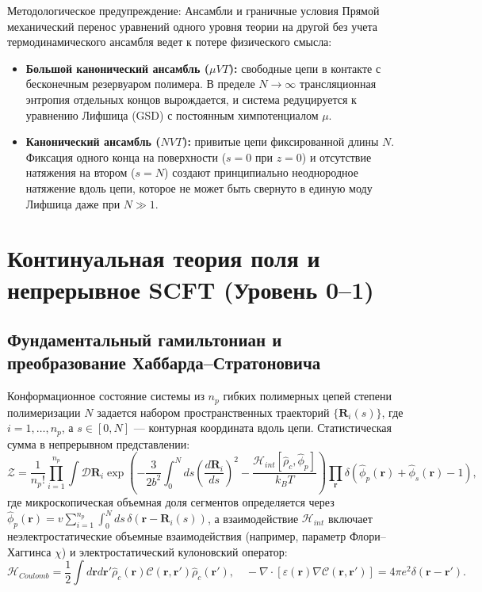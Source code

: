\documentclass[12pt,a4paper]{article}
\begin{document}
\begin{warningbox}{Методологическое предупреждение: Ансамбли и граничные условия}
Прямой механический перенос уравнений одного уровня теории на другой без учета термодинамического ансамбля ведет к потере физического смысла:
\begin{itemize}
    \item \textbf{Большой канонический ансамбль ($\mu VT$):} свободные цепи в контакте с бесконечным резервуаром полимера. В пределе $N \to \infty$ трансляционная энтропия отдельных концов вырождается, и система редуцируется к уравнению Лифшица (GSD) с постоянным химпотенциалом $\mu$.
    \item \textbf{Канонический ансамбль ($NVT$):} привитые цепи фиксированной длины $N$. Фиксация одного конца на поверхности ($s=0$ при $z=0$) и отсутствие натяжения на втором ($s=N$) создают принципиально неоднородное натяжение вдоль цепи, которое не может быть свернуто в единую моду Лифшица даже при $N \gg 1$.
\end{itemize}
\end{warningbox}

\section{Континуальная теория поля и непрерывное SCFT (Уровень 0--1)}

\subsection{Фундаментальный гамильтониан и преобразование Хаббарда--Стратоновича}
Конформационное состояние системы из $n_p$ гибких полимерных цепей степени полимеризации $N$ задается набором пространственных траекторий $\{\mathbf{R}_i(s)\}$, где $i = 1, \dots, n_p$, а $s \in [0, N]$ --- контурная координата вдоль цепи. Статистическая сумма в непрерывном представлении:
\begin{equation}
\mathcal{Z} = \frac{1}{n_p!} \prod_{i=1}^{n_p} \int \mathcal{D}\mathbf{R}_i \exp\left( -\frac{3}{2b^2}\int_0^N ds \left(\frac{d\mathbf{R}_i}{ds}\right)^2 - \frac{\mathcal{H}_{int}[\hat{\rho}_c, \hat{\phi}_p]}{k_B T} \right) \prod_{\mathbf{r}} \delta\left(\hat{\phi}_p(\mathbf{r}) + \hat{\phi}_s(\mathbf{r}) - 1\right),
\end{equation}
где микроскопическая объемная доля сегментов определяется через $\hat{\phi}_p(\mathbf{r}) = v \sum_{i=1}^{n_p} \int_0^N ds \, \delta(\mathbf{r} - \mathbf{R}_i(s))$, а взаимодействие $\mathcal{H}_{int}$ включает неэлектростатические объемные взаимодействия (например, параметр Флори--Хаггинса $\chi$) и электростатический кулоновский оператор:
\begin{equation}
\mathcal{H}_{Coulomb} = \frac{1}{2} \int d\mathbf{r} d\mathbf{r}' \hat{\rho}_c(\mathbf{r}) \mathcal{C}(\mathbf{r}, \mathbf{r}') \hat{\rho}_c(\mathbf{r}'), \quad -\nabla \cdot [\varepsilon(\mathbf{r}) \nabla \mathcal{C}(\mathbf{r}, \mathbf{r}')] = 4\pi e^2 \delta(\mathbf{r} - \mathbf{r}').
\end{equation}
\end{document}
